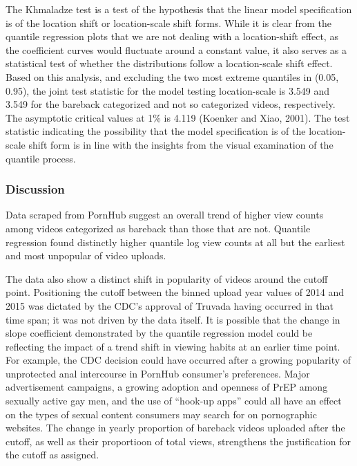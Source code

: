 \documentclass[]{article}
\begin{document}
The Khmaladze test is a test of the hypothesis that the linear model
specification is of the location shift or location-scale shift forms.
While it is clear from the quantile regression plots that we are not
dealing with a location-shift effect, as the coefficient curves would
fluctuate around a constant value, it also serves as a statistical test
of whether the distributions follow a location-scale shift effect. Based
on this analysis, and excluding the two most extreme quantiles in (0.05,
0.95), the joint test statistic for the model testing location-scale is
3.549 and 3.549 for the bareback categorized and not so categorized
videos, respectively. The asymptotic critical values at 1\% is 4.119
(Koenker and Xiao, 2001). The test statistic indicating the possibility
that the model specification is of the location-scale shift form is in
line with the insights from the visual examination of the quantile
process.

\subsubsection{Discussion}\label{discussion}

Data scraped from PornHub suggest an overall trend of higher view counts
among videos categorized as bareback than those that are not. Quantile
regression found distinctly higher quantile log view counts at all but
the earliest and most unpopular of video uploads.

The data also show a distinct shift in popularity of videos around the
cutoff point. Positioning the cutoff between the binned upload year
values of 2014 and 2015 was dictated by the CDC's approval of Truvada
having occurred in that time span; it was not driven by the data itself.
It is possible that the change in slope coefficient demonstrated by the
quantile regression model could be reflecting the impact of a trend
shift in viewing habits at an earlier time point. For example, the CDC
decision could have occurred after a growing popularity of unprotected
anal intercourse in PornHub consumer's preferences. Major advertisement
campaigns, a growing adoption and openness of PrEP among sexually active
gay men, and the use of ``hook-up apps'' could all have an effect on the
types of sexual content consumers may search for on pornographic
websites. The change in yearly proportion of bareback videos uploaded
after the cutoff, as well as their proportioon of total views,
strengthens the justification for the cutoff as assigned.
\end{document}
